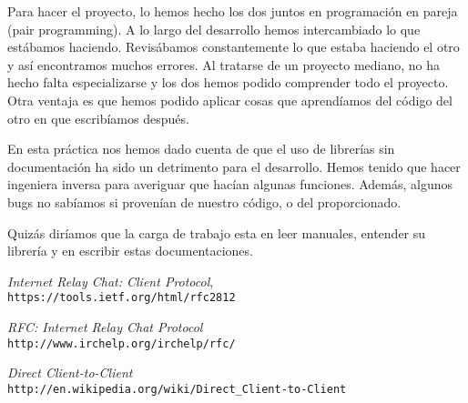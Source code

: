 \documentclass[12pt, a4paper]{memoriaeps}
\begin{document}

Para hacer el proyecto, lo hemos hecho los dos juntos en programación en pareja (pair programming). A lo largo del desarrollo hemos intercambiado lo que estábamos haciendo. Revisábamos constantemente lo que estaba haciendo el otro y así encontramos muchos errores. Al tratarse de un proyecto mediano, no ha hecho falta especializarse y los dos hemos podido comprender todo el proyecto. Otra ventaja es que hemos podido aplicar cosas que aprendíamos del código del otro en que escribíamos después.

En esta práctica nos hemos dado cuenta de que el uso de librerías sin documentación ha sido un detrimento para el desarrollo. Hemos tenido que hacer ingeniera inversa para averiguar que hacían algunas funciones. Además, algunos bugs no sabíamos si provenían de nuestro código, o del proporcionado.

Quizás diríamos que la carga de trabajo esta en leer manuales, entender su librería y en escribir estas documentaciones.




\begin{thebibliography}{9}

\textit{Internet Relay Chat: Client Protocol},
\\\texttt{https://tools.ietf.org/html/rfc2812}

\textit{RFC: Internet Relay Chat Protocol}
\\\texttt{http://www.irchelp.org/irchelp/rfc/}

\textit{Direct Client-to-Client}
\\\texttt{http://en.wikipedia.org/wiki/Direct_Client-to-Client}

\end{thebibliography}
\end{document}
